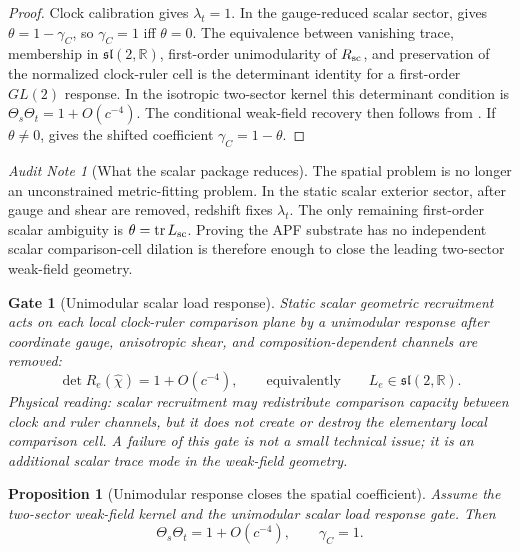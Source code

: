\documentclass[11pt]{article}
\newtheorem{proposition}[theorem]{Proposition}
\newtheorem{gate}[theorem]{Gate}
\theoremstyle{remark}
\newtheorem{audit}[theorem]{Audit Note}
\begin{document}
\begin{proof}
Clock calibration gives \(\lambda_t=1\).  In the gauge-reduced scalar sector,  gives \(\theta=1-\gamma_C\), so \(\gamma_C=1\) iff \(\theta=0\).  The equivalence between vanishing trace, membership in \(\mathfrak{sl}(2,\mathbb R)\), first-order unimodularity of \(R_{\rm sc}\), and preservation of the normalized clock-ruler cell is the determinant identity for a first-order \(GL(2)\) response.  In the isotropic two-sector kernel this determinant condition is \(\Theta_s\Theta_t=1+O(c^{-4})\).  The conditional weak-field recovery then follows from .  If \(\theta\neq0\),  gives the shifted coefficient \(\gamma_C=1-\theta\).
\end{proof}

\begin{audit}[What the scalar package reduces]
The spatial problem is no longer an unconstrained metric-fitting problem.  In the static scalar exterior sector, after gauge and shear are removed, redshift fixes \(\lambda_t\).  The only remaining first-order scalar ambiguity is \(\theta=\operatorname{tr}L_{\rm sc}\).  Proving the APF substrate has no independent scalar comparison-cell dilation is therefore enough to close the leading two-sector weak-field geometry.
\end{audit}

\begin{gate}[Unimodular scalar load response]
\label{gate:unimodular-load-response}
Static scalar geometric recruitment acts on each local clock-ruler comparison plane by a unimodular response after coordinate gauge, anisotropic shear, and composition-dependent channels are removed:
\[
        \det R_e(\hat\chi)=1+O(c^{-4}),
        \qquad\text{equivalently}\qquad
        L_e\in\mathfrak{sl}(2,\mathbb R).
\]
Physical reading: scalar recruitment may redistribute comparison capacity between clock and ruler channels, but it does not create or destroy the elementary local comparison cell.  A failure of this gate is not a small technical issue; it is an additional scalar trace mode in the weak-field geometry.
\end{gate}

\begin{proposition}[Unimodular response closes the spatial coefficient]
\label{prop:unimodular-implies-gamma}
Assume the two-sector weak-field kernel and the unimodular scalar load response gate.  Then
\[
        \Theta_s\Theta_t=1+O(c^{-4}),
        \qquad
        \gamma_C=1.
\]
\end{proposition}
\end{document}
